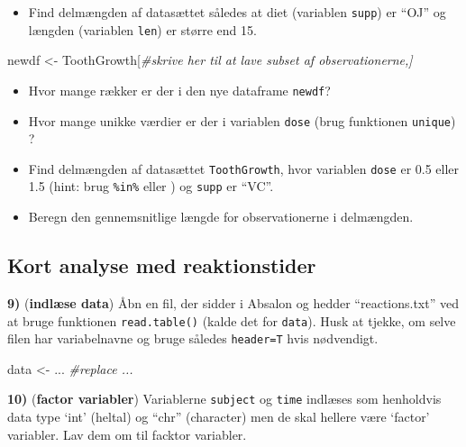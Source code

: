 \documentclass[
]{book}
\newenvironment{Shaded}{\begin{snugshade}}{\end{snugshade}}
\newcommand{\CommentTok}[1]{\textcolor[rgb]{0.56,0.35,0.01}{\textit{#1}}}
\newcommand{\NormalTok}[1]{#1}
\newcommand{\OtherTok}[1]{\textcolor[rgb]{0.56,0.35,0.01}{#1}}
\providecommand{\tightlist}{%
  \setlength{\itemsep}{0pt}\setlength{\parskip}{0pt}}
\begin{document}
\begin{itemize}
\tightlist
\item
  Find delmængden af datasættet således at diet (variablen \texttt{supp}) er ``OJ'' og længden (variablen \texttt{len}) er større end 15.
\end{itemize}

\begin{Shaded}
\begin{Highlighting}[]
\NormalTok{newdf }\OtherTok{\textless{}{-}}\NormalTok{ ToothGrowth[}\CommentTok{\#skrive her til at lave subset af observationerne,]}
\end{Highlighting}
\end{Shaded}

\begin{itemize}
\tightlist
\item
  Hvor mange rækker er der i den nye dataframe \texttt{newdf}?
\item
  Hvor mange unikke værdier er der i variablen \texttt{dose} (brug funktionen \texttt{unique}) ?
\item
  Find delmængden af datasættet \texttt{ToothGrowth}, hvor variablen \texttt{dose} er 0.5 eller 1.5 (hint: brug \texttt{\%in\%} eller \texttt{\textbar{}}) og \texttt{supp} er ``VC''.
\item
  Beregn den gennemsnitlige længde for observationerne i delmængden.
\end{itemize}

\hypertarget{kort-analyse-med-reaktionstider}{%
\subsection{Kort analyse med reaktionstider}\label{kort-analyse-med-reaktionstider}}

\textbf{9)} (\textbf{indlæse data}) Åbn en fil, der sidder i Absalon og hedder ``reactions.txt'' ved at bruge funktionen \texttt{read.table()} (kalde det for \texttt{data}). Husk at tjekke, om selve filen har variabelnavne og bruge således \texttt{header=T} hvis nødvendigt.

\begin{Shaded}
\begin{Highlighting}[]
\NormalTok{data }\OtherTok{\textless{}{-}}\NormalTok{ ... }\CommentTok{\#replace ...}
\end{Highlighting}
\end{Shaded}

\textbf{10)} (\textbf{factor variabler}) Variablerne \texttt{subject} og \texttt{time} indlæses som henholdvis data type `int' (heltal) og ``chr'' (character) men de skal hellere være `factor' variabler. Lav dem om til facktor variabler.
\end{document}
